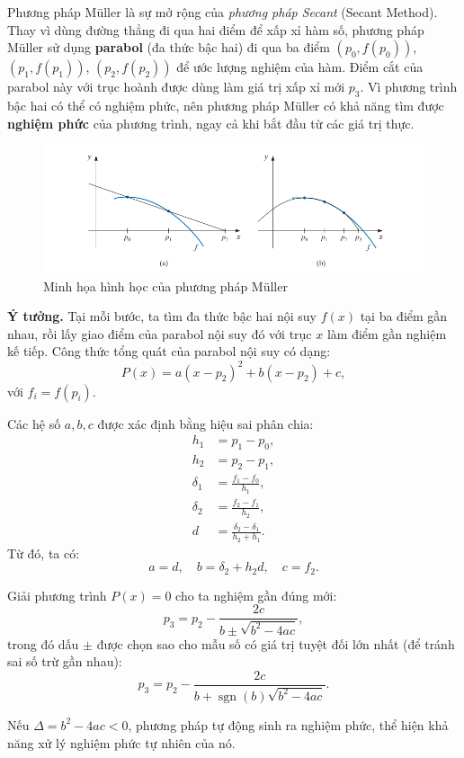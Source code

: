 Phương pháp Müller là sự mở rộng của \textit{phương pháp Secant} (Secant Method).  
Thay vì dùng đường thẳng đi qua hai điểm để xấp xỉ hàm số, phương pháp Müller sử dụng \textbf{parabol} (đa thức bậc hai) đi qua ba điểm $(p_0, f(p_0))$, $(p_1, f(p_1))$, $(p_2, f(p_2))$ để ước lượng nghiệm của hàm.  
Điểm cắt của parabol này với trục hoành được dùng làm giá trị xấp xỉ mới $p_3$.  
Vì phương trình bậc hai có thể có nghiệm phức, nên phương pháp Müller có khả năng tìm được \textbf{nghiệm phức} của phương trình, ngay cả khi bắt đầu từ các giá trị thực.
\begin{figure}[H]
    \centering
    \includegraphics[width=1\linewidth]{figures/image.png}
    \caption{Minh họa hình học của phương pháp Müller}
    \label{fig:placeholder}
\end{figure}
\textbf{Ý tưởng.}  
Tại mỗi bước, ta tìm đa thức bậc hai nội suy $f(x)$ tại ba điểm gần nhau, rồi lấy giao điểm của parabol nội suy đó với trục $x$ làm điểm gần nghiệm kế tiếp.  
Công thức tổng quát của parabol nội suy có dạng:
\[
P(x) = a(x - p_2)^2 + b(x - p_2) + c,
\]
với $f_i = f(p_i)$.

Các hệ số $a,b,c$ được xác định bằng hiệu sai phân chia:
\[
\begin{aligned}
h_1 &= p_1 - p_0, \\
h_2 &= p_2 - p_1, \\
\delta_1 &= \frac{f_1 - f_0}{h_1}, \\
\delta_2 &= \frac{f_2 - f_1}{h_2}, \\
d &= \frac{\delta_2 - \delta_1}{h_2 + h_1}.
\end{aligned}
\]
Từ đó, ta có:
\[
a = d, \quad b = \delta_2 + h_2 d, \quad c = f_2.
\]

Giải phương trình $P(x) = 0$ cho ta nghiệm gần đúng mới:
\[
p_3 = p_2 - \frac{2c}{b \pm \sqrt{b^2 - 4ac}},
\]
trong đó dấu $\pm$ được chọn sao cho mẫu số có giá trị tuyệt đối lớn nhất (để tránh sai số trừ gần nhau):
\[
p_3 = p_2 - \frac{2c}{b + \operatorname{sgn}(b)\sqrt{b^2 - 4ac}}.
\]

Nếu $\Delta = b^2 - 4ac < 0$, phương pháp tự động sinh ra nghiệm phức, thể hiện khả năng xử lý nghiệm phức tự nhiên của nó.


